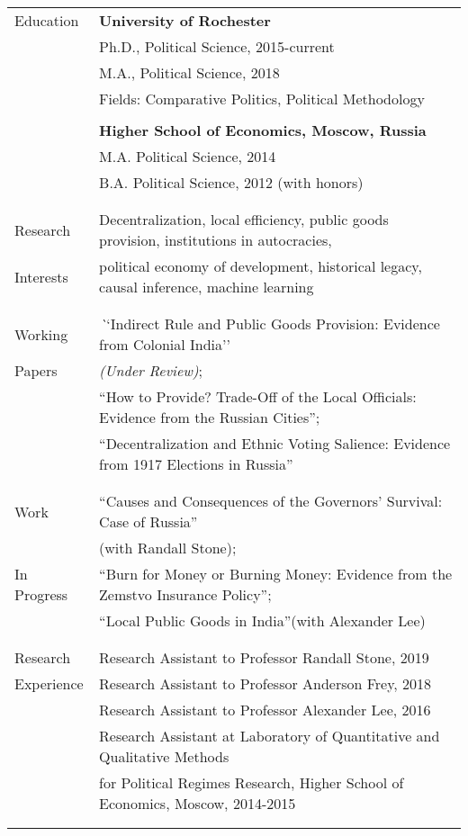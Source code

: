 \documentclass[letterpaper,11pt,oneside]{article}
\begin{document}
\noindent \begin{tabular}{@{} l l}
 \Large{Education}    & \textbf{University of Rochester} \\
     & Ph.D., Political Science, 2015-current \\
     & M.A., Political Science, 2018 \\
     & Fields: Comparative Politics, Political Methodology \\
     \vspace*{-2mm}
     & \\
     & \textbf{Higher School of Economics, Moscow, Russia} \\
     & M.A. Political Science, 2014 \\
     & B.A. Political Science, 2012 (with honors) \\
     & \\
&\\
\Large{Research} & Decentralization, local efficiency, public goods provision,  institutions in autocracies,  \\
\Large{Interests} &political economy of development, historical legacy, causal inference, machine learning\\
 & \\
&\\
\Large{Working}
 & \textit``Indirect Rule and Public Goods Provision: Evidence from Colonial  India''\\
 \Large{Papers}& \textit{(Under Review)};\\
 & ``How to Provide? Trade-Off of the Local Officials: Evidence from the Russian Cities'';\\
 &   ``Decentralization and Ethnic Voting Salience: Evidence from 1917 Elections in Russia''\\
  & \\
 &\\
 \Large{Work}
 & ``Causes and Consequences of the Governors' Survival: Case of Russia''\\
 & (with Randall Stone);\\
 \Large{In Progress}
 & ``Burn for Money or Burning Money: Evidence from the Zemstvo Insurance Policy'';\\
  & ``Local Public Goods in India''(with Alexander Lee)\\
&\\
&\\
 \Large{Research} & Research Assistant to Professor Randall Stone, 2019\\
 \Large{Experience}&Research Assistant to Professor Anderson Frey, 2018\\
 & Research Assistant to Professor Alexander Lee, 2016\\
 & Research Assistant at Laboratory of Quantitative and Qualitative Methods \\
 &for Political Regimes Research, Higher School of Economics, Moscow, 2014-2015 \\
 &\\
 & \\


\end{tabular}
\end{document}
